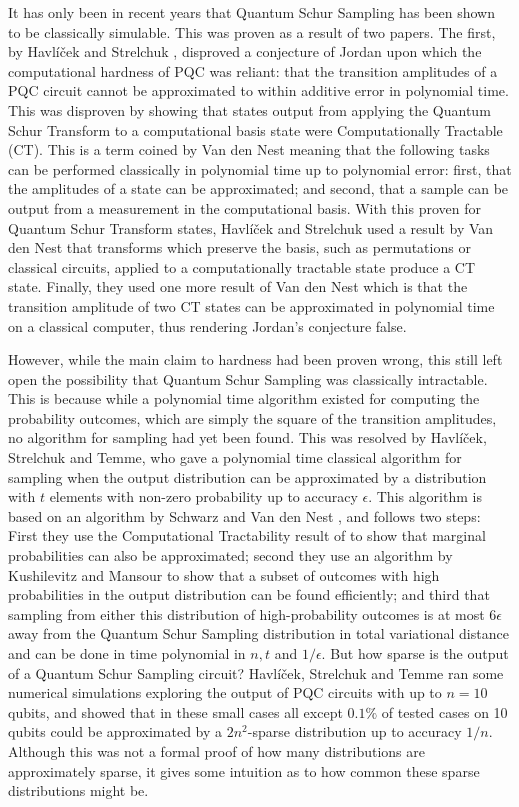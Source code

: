 It has only been in recent years that Quantum Schur Sampling has been shown to be classically simulable. This was proven as a result of two papers. The first, by Havl\'{i}\v{c}ek and Strelchuk \cite{havlicek2018}, disproved a conjecture of Jordan upon which the computational hardness of PQC was reliant: that the transition amplitudes of a PQC circuit cannot be approximated to within additive error in polynomial time. This was disproven by showing that states output from applying the Quantum Schur Transform to a computational basis state were Computationally Tractable (CT). This is a term coined by Van den Nest \cite{vandennest2011} meaning that the following tasks can be performed classically in polynomial time up to polynomial error: first, that the amplitudes of a state can be approximated; and second, that a sample can be output from a measurement in the computational basis. With this proven for Quantum Schur Transform states, Havl\'{i}\v{c}ek and Strelchuk used a result by Van den Nest that transforms which preserve the basis, such as permutations or classical circuits, applied to a computationally tractable state produce a CT state. Finally, they used one more result of Van den Nest which is that the transition amplitude of two CT states can be approximated in polynomial time on a classical computer, thus rendering Jordan's conjecture false.

However, while the main claim to hardness had been proven wrong, this still left open the possibility that Quantum Schur Sampling was classically intractable. This is because while a polynomial time algorithm existed for computing the probability outcomes, which are simply the square of the transition amplitudes, no algorithm for sampling had yet been found. This was resolved by Havl\'{i}\v{c}ek, Strelchuk and Temme, who gave a polynomial time classical algorithm for sampling when the output distribution can be approximated by a distribution with $t$ elements with non-zero probability up to accuracy $\epsilon$. This algorithm is based on an algorithm by Schwarz and Van den Nest \cite{schwarz2013}, and follows two steps: First they use the Computational Tractability result of \cite{havlicek2018} to show that marginal probabilities can also be approximated; second they use an algorithm by Kushilevitz and Mansour to show that a subset of outcomes with high probabilities in the output distribution can be found efficiently; and third that sampling from either this distribution of high-probability outcomes is at most $6\epsilon$ away from the Quantum Schur Sampling distribution in total variational distance and can be done in time polynomial in $n, t$ and $1/\epsilon$. But how sparse is the output of a Quantum Schur Sampling circuit? Havl\'{i}\v{c}ek, Strelchuk and Temme ran some numerical simulations exploring the output of PQC circuits with up to $n=10$ qubits, and showed that in these small cases all except $0.1\%$ of tested cases on 10 qubits could be approximated by a $2n^2$-sparse distribution up to accuracy $1/n$. Although this was not a formal proof of how many distributions are approximately sparse, it gives some intuition as to how common these sparse distributions might be.
